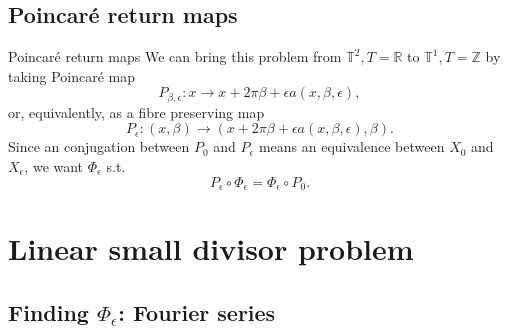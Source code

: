 \documentclass[]{beamer}
\newcommand{\e}{\epsilon}
\newcommand{\be}{\beta}
\newcommand{\om}{\omega}
\newcommand{\T}{\mathbb{T}}
\begin{document}
\subsection{Poincar\'{e} return maps}

%     
%     
%     
%     
%     
%     
%     

\begin{frame}{Poincar\'{e} return maps}
    We can bring this problem
    from $\T^2, T=\mathbb{R}$ to $\T^1, T=\mathbb{Z}$ by taking Poincar\'e map
    \begin{equation*}
        P_{\be,\e} : x \to x + 2 \pi \be + \e a(x, \be, \e),
    \end{equation*}
    or, equivalently, as a fibre preserving map
    \begin{equation*}
        P_{\e} : (x, \be) \to (x + 2 \pi \be + \e a(x, \be, \e), \be).
    \end{equation*}
    \pause
    Since an conjugation between $P_0$ and $P_\e$ means an
    equivalence between $X_0$ and $X_\e$, we want $\Phi_\e$ s.t.
    \begin{equation*}
        P_\e \circ \Phi_\e = \Phi_\e \circ P_0.
    \end{equation*}
    
\end{frame}

\section{Linear small divisor problem}

\subsection{Finding $\Phi_\e$: Fourier series}
\end{document}
